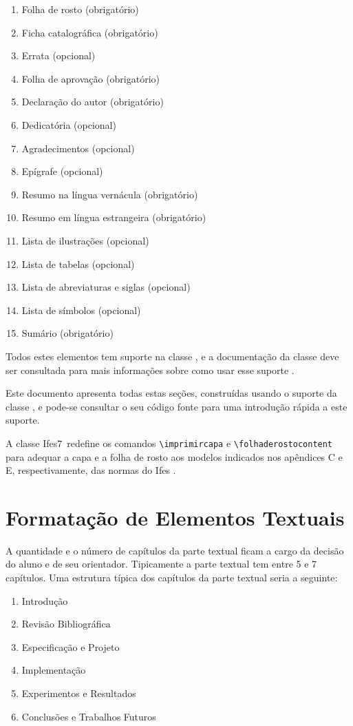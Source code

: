 \documentclass[times,english,brazil,oneside]{ifes7}
\newcommand{\ifestex}{\textsf{Ifes$7$}}
\begin{document}
\begin{enumerate}
\item Folha de rosto (obrigatório)
\item Ficha catalográfica (obrigatório)
\item Errata (opcional)
\item Folha de aprovação (obrigatório)
\item Declaração do autor (obrigatório)
\item Dedicatória (opcional)
\item Agradecimentos (opcional)
\item Epígrafe (opcional)
\item Resumo na língua vernácula (obrigatório)
\item Resumo em língua estrangeira (obrigatório)
\item Lista de ilustrações (opcional)
\item Lista de tabelas (opcional)
\item Lista de abreviaturas e siglas (opcional)
\item Lista de símbolos (opcional)
\item Sumário (obrigatório)
\end{enumerate}

Todos estes elementos tem suporte na classe \abnTeX, e a documentação
da classe deve ser consultada para mais informações sobre como usar
esse suporte \cite{Araujo2016}.

Este documento apresenta todas estas seções, construídas usando o
suporte da classe \abnTeX, e pode-se consultar o seu código fonte para
uma introdução rápida a este suporte.

A classe \ifestex\ redefine os comandos \verb!\imprimircapa! e
\verb!\folhaderostocontent! para adequar a capa e a folha de rosto aos
modelos indicados nos apêndices C e E, respectivamente, das normas do
Ifes \cite{Ifes2014}.



\chapter{Formatação de Elementos Textuais}
\label{cha:format-text}

A quantidade e o número de capítulos da parte textual ficam a cargo da
decisão do aluno e de seu orientador. Tipicamente a parte textual tem
entre 5 e 7 capítulos. Uma estrutura típica dos capítulos da parte
textual seria a seguinte:

\begin{SingleSpace}
  \begin{enumerate}
  \item Introdução
  \item Revisão Bibliográfica
  \item Especificação e Projeto
  \item Implementação
  \item Experimentos e Resultados
  \item Conclusões e Trabalhos Futuros
  \end{enumerate}
\end{SingleSpace}
\end{document}
